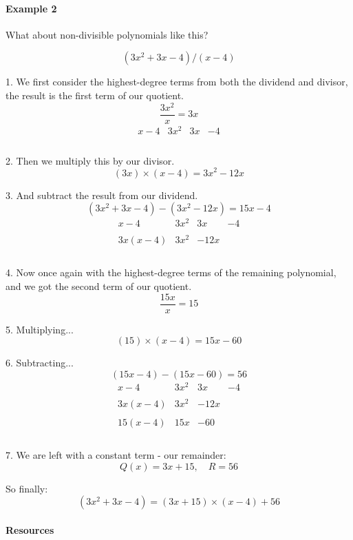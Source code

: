 \paragraph{Example 2}

What about non-divisible polynomials like this?

$$(3x^2 + 3x - 4) / (x - 4)$$

1. We first consider the highest-degree terms from both the dividend and divisor, the result is the first term of our quotient.
   $$\frac{3x^2}{x} = 3x$$
   $$
   \begin{array}{r|ccc}
   x - 4 & 3x^2 & 3x & -4 \\\\
   \end{array}
   $$

2. Then we multiply this by our divisor.
   $$(3x) \times (x - 4) = 3x^2 - 12x$$

3. And subtract the result from our dividend.
   $$(3x^2 + 3x - 4) - (3x^2 - 12x) = 15x - 4$$
   $$
   \begin{array}{r|ccc}
   x - 4 & 3x^2 & 3x & -4 \\\\
   3x(x - 4) & 3x^2 & -12x & \\\\
   \end{array}
   $$

4. Now once again with the highest-degree terms of the remaining polynomial, and we got the second term of our quotient.
   $$\frac{15x}{x} = 15$$

5. Multiplying...
   $$(15) \times (x - 4) = 15x - 60$$

6. Subtracting...
   $$(15x - 4) - (15x - 60) = 56$$
   $$
   \begin{array}{r|ccc}
   x - 4 & 3x^2 & 3x & -4 \\\\
   3x(x - 4) & 3x^2 & -12x & \\\\
   15(x - 4) & 15x & -60 \\\\
   \end{array}
   $$

7. We are left with a constant term - our remainder:
   $$Q(x) = 3x + 15, \quad R = 56$$

So finally:
$$(3x^2 + 3x - 4) = (3x + 15) \times (x - 4) + 56$$

\paragraph{Resources}

